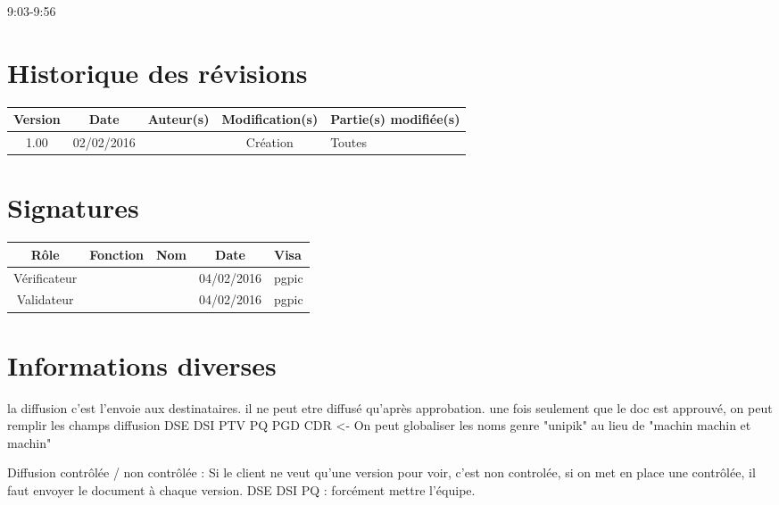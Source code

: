 \documentclass [a4paper] {article}
\begin{document}
\rhead{}
\hfill   
\hfill 	9:03-9:56 				%



\section*{Historique des révisions}
\begin{center}
			\begin{tabular}{| c | c | c | c | p{4cm} |}
				\hline
				\rowcolor{Gray}
				Version & Date & Auteur(s) & Modification(s) & Partie(s) modifiée(s)		 \\
				\hline
				1.00 & 02/02/2016 & \Pierre & Création & Toutes \\
		\hline		
			\end{tabular}
		\end{center}

\section*{Signatures}

		\begin{center}
			\begin{tabular}{| c | c | c | c | p{4cm} |}
				\hline
				\rowcolor{Gray}
				Rôle & Fonction & Nom & Date & Visa		 \\
				\hline
				Vérificateur & \RQA & \Kafui & 04/02/2016 & pgpic \\[30pt]
				\hline
				Validateur & \CP & \Sergi & 04/02/2016 & pgpic \\[30pt]	
				\hline
			\end{tabular}
		\end{center}


\section{Informations diverses}
la diffusion c'est l'envoie aux destinataires. il ne peut etre diffusé qu'après approbation. une fois seulement que le doc est approuvé, on peut remplir les champs diffusion
DSE DSI PTV PQ PGD CDR <- On peut globaliser les noms genre "unipik" au lieu de "machin machin et machin"

Diffusion contrôlée / non contrôlée  :
Si le client ne veut qu'une version pour voir, c'est non controlée, si on met en place une contrôlée, il faut envoyer le document à chaque version. DSE DSI PQ : forcément mettre l'équipe.
\end{document}
